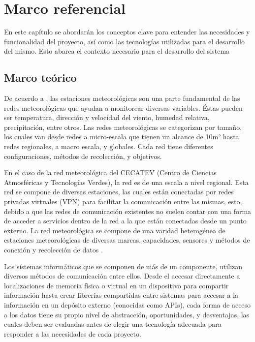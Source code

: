 \chapter{Marco referencial}

En este capítulo se abordarán los conceptos clave para entender las necesidades y funcionalidad del proyecto, así como las tecnologías utilizadas para el desarrollo del mismo. Esto abarca el contexto necesario para el desarrollo del sistema

\section{Marco teórico}

De acuerdo a \cite{muller_sensors_and_the_city}, las estaciones meteorológicas son una parte fundamental de las redes meteorológicas que ayudan a monitorear diversas variables. Éstas pueden ser temperatura, dirección y velocidad del viento, humedad relativa, precipitación, entre otros. Las redes meteorológicas se categorizan por tamaño, los cuales van desde redes a micro-escala que tienen un alcance de 10m² hasta redes regionales, a macro escala, y globales. Cada red tiene diferentes configuraciones, métodos de recolección, y objetivos.

En el caso de la red meteorológica del CECATEV (Centro de Ciencias Atmosféricas y Tecnologías Verdes), la red es de una escala a nivel regional. Esta red se compone de diversas estaciones, las cuales están conectadas por redes privadas virtuales (VPN) para facilitar la comunicación entre las mismas, esto, debido a que las redes de comunicación existentes no suelen contar con una forma de acceder a servicios dentro de la red a la que están conectadas desde un punto externo. La red meteorológica se compone de una varidad heterogénea de estaciones meteorológicas de diversas marcas, capacidades, sensores y métodos de conexión y recolección de datos \cite{red_climatologica_uacj}.





Los sistemas informáticos que se componen de más de un componente, utilizan diversos métodos de comunicación entre ellos. Desde el accesar directamente a localizaciones de memoria física o virtual en un dispositivo para compartir información hasta crear librerías compartidas entre sistemas para accesar a la información en un depósito externo (conocidas como APIs), cada forma de acceso a los datos tiene su propio nivel de abstracción, oportunidades, y desventajas, las cuales deben ser evaluadas antes de elegir una tecnología adecuada para responder a las necesidades de cada proyecto.


